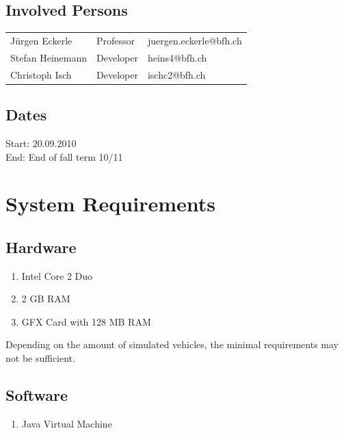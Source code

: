 \documentclass[a4paper,10pt,titlepage]{article}
\begin{document}

\subsection{Involved Persons}

\begin{tabularx}{\textwidth}{XXX}
 Jürgen Eckerle & Professor & juergen.eckerle@bfh.ch \\
 Stefan Heinemann & Developer & heins4@bfh.ch \\
 Christoph Isch & Developer & ischc2@bfh.ch \\
\end{tabularx}

\subsection{Dates}

Start: 20.09.2010 \\
End: End of fall term 10/11

\section{System Requirements}

\subsection{Hardware}
\begin{enumerate}
 \item Intel Core 2 Duo
 \item 2 GB RAM
 \item GFX Card with 128 MB RAM
\end{enumerate}

Depending on the amount of simulated vehicles, the minimal requirements may not be sufficient.


\subsection{Software}
\begin{enumerate}
 \item Java Virtual Machine
\end{enumerate}
\end{document}
